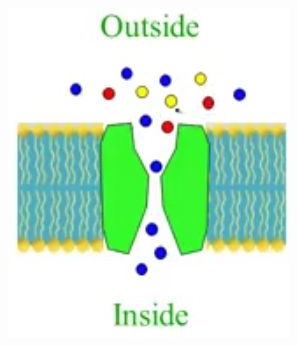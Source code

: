 \documentclass[]{article}
\begin{document}
\begin{figure}[H]
\begin{subfigure}[t]{0.45\textwidth}
		\includegraphics[width=\textwidth]{ionic-channel}
	\end{subfigure}
\end{figure}
\end{document}
